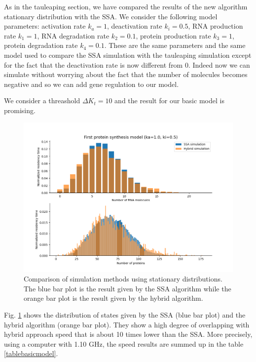 \documentclass[12pt,a4paper]{report}
\begin{document}
As in the tauleaping section, we have compared the results of the new algorithm stationary distribution with the SSA. We consider the following model parameters: activation rate $k_{a}=1$, deactivation rate $k_{i}=0.5$, RNA production rate $k_{1}=1$, RNA degradation rate $k_{2}=0.1$, protein production rate $k_{3}=1$, protein degradation rate $k_{4}=0.1$. These are the same parameters and the same model used to compare the SSA simulation with the tauleaping simulation except for the fact that the deactivation rate is now different from 0. Indeed now we can simulate without worrying about the fact that the number of molecules becomes negative and so we can add gene regulation to our model.

We consider a threashold $\Delta K_{t} = 10$ and the result for our basic model is promising.
\newpage
\begin{figure}[!ht]
\centering
\includegraphics[scale=0.70]{ka1ki0.5SSA1min47sHybrid7.5stimelimit14000.png}
\caption{Comparison of simulation methods using stationary distributions. The blue bar plot is the result given by the SSA algorithm while the orange bar plot is the result given by the hybrid algorithm.}
\label{SSAHybridBasicModel}
\end{figure}

Fig. \ref{SSAHybridBasicModel} shows the distribution of states given by the SSA (blue bar plot) and the hybrid algorithm (orange bar plot). They show a high degree of overlapping with hybrid approach speed that is about 10 times lower than the SSA. More precisely, using a computer with 1.10 GHz, the speed results are summed up in the table \ref{tablebasicmodel}.
\end{document}
